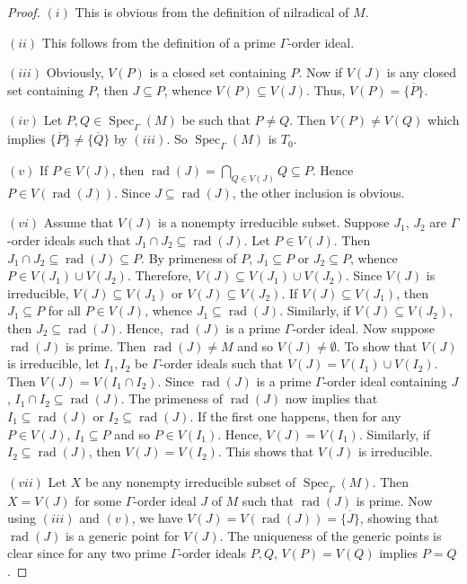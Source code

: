 \documentclass[10pt,a4paper]{amsart}
\newcommand{\Spec}{\operatorname{Spec}}
\newcommand{\rad}{\operatorname{rad}}
\begin{document}
\begin{proof}
$(i)$ This is obvious from the definition of nilradical of $M$. 

$(ii)$ This follows from the definition of a prime $\Gamma$-order ideal.

$(iii)$ Obviously, $V(P)$ is a closed set containing $P$. Now if $V(J)$ is any closed set containing $P$, then $J\subseteq P$, whence $V(P)\subseteq V(J)$. Thus, $V(P)=\overline{\{P\}}$.

$(iv)$ Let $P,Q\in \Spec_\Gamma(M)$ be such that $P\neq Q$. Then $V(P)\neq V(Q)$ which implies $\overline{\{P\}}\neq \overline{\{Q\}}$ by $(iii)$. So $\Spec_\Gamma(M)$ is $T_0$. 

$(v)$ If $P\in V(J)$, then $\rad(J)=\displaystyle{\bigcap_{Q\in V(J)}}Q\subseteq P$. Hence $P\in V(\rad(J))$. Since $J\subseteq \rad(J)$, the other inclusion is obvious. 

$(vi)$ Assume that $V(J)$ is a nonempty irreducible subset. Suppose $J_1$, $J_2$ are $\Gamma$-order ideals such that $J_1\cap J_2\subseteq \rad(J)$. Let $P\in V(J)$. Then $J_1\cap J_2\subseteq \rad(J)\subseteq P$. By primeness of $P$, $J_1\subseteq P$ or $J_2\subseteq P$, whence $P\in V(J_1)\cup V(J_2)$. Therefore, $V(J)\subseteq V(J_1)\cup V(J_2)$. Since $V(J)$ is irreducible, $V(J)\subseteq V(J_1)$ or $V(J)\subseteq V(J_2)$. If $V(J)\subseteq V(J_1)$, then $J_1\subseteq P$ for all $P\in V(J)$, whence $J_1\subseteq \rad(J)$. Similarly, if $V(J)\subseteq V(J_2)$, then $J_2\subseteq \rad(J)$. Hence, $\rad(J)$ is a prime $\Gamma$-order ideal. Now suppose $\rad(J)$ is prime. Then $\rad(J)\neq M$ and so $V(J)\neq \emptyset$. To show that $V(J)$ is irreducible, let $I_1,I_2$ be $\Gamma$-order ideals such that $V(J)=V(I_1)\cup V(I_2)$. Then $V(J)=V(I_1\cap I_2)$. Since $\rad(J)$ is a prime $\Gamma$-order ideal containing $J$, $I_1\cap I_2\subseteq \rad(J)$. The primeness of $\rad(J)$ now implies that $I_1\subseteq \rad(J)$ or $I_2\subseteq \rad(J)$. If the first one happens, then for any $P\in V(J)$, $I_1\subseteq P$ and so $P\in V(I_1)$. Hence, $V(J)=V(I_1)$. Similarly, if $I_2\subseteq \rad(J)$, then $V(J)=V(I_2)$. This shows that $V(J)$ is irreducible.  

$(vii)$ Let $X$ be any nonempty irreducible subset of $\Spec_\Gamma(M)$. Then $X=V(J)$ for some $\Gamma$-order ideal $J$ of $M$ such that $\rad(J)$ is prime. Now using $(iii)$ and $(v)$, we have $V(J)=V(\rad(J))=\overline{\{J\}}$, showing that $\rad(J)$ is a generic point for $V(J)$. The uniqueness of the generic points is clear since for any two prime $\Gamma$-order ideals $P, Q$, $V (P ) = V (Q)$ implies $P = Q$.


\end{proof}
\end{document}
